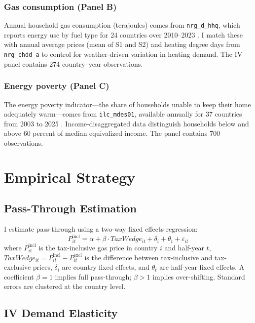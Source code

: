 \documentclass[12pt]{article}
\begin{document}
\subsubsection*{Gas consumption (Panel B)} Annual household gas consumption (terajoules) comes from \texttt{nrg\_d\_hhq}, which reports energy use by fuel type for 24 countries over 2010--2023 \citep{eurostat_nrg_d_hhq}. I match these with annual average prices (mean of S1 and S2) and heating degree days from \texttt{nrg\_chdd\_a} to control for weather-driven variation in heating demand. The IV panel contains 274 country--year observations.

\subsubsection*{Energy poverty (Panel C)} The energy poverty indicator---the share of households unable to keep their home adequately warm---comes from \texttt{ilc\_mdes01}, available annually for 37 countries from 2003 to 2025 \citep{eurostat_ilc_mdes01}. Income-disaggregated data distinguish households below and above 60 percent of median equivalized income. The panel contains 700 observations.




\section{Empirical Strategy}
\label{sec:strategy}

\subsection{Pass-Through Estimation}

I estimate pass-through using a two-way fixed effects regression:
\begin{equation}
P_{it}^{\text{incl}} = \alpha + \beta \cdot TaxWedge_{it} + \delta_i + \theta_t + \varepsilon_{it}
\label{eq:passthrough}
\end{equation}
where $P_{it}^{\text{incl}}$ is the tax-inclusive gas price in country $i$ and half-year $t$, $TaxWedge_{it} = P_{it}^{\text{incl}} - P_{it}^{\text{excl}}$ is the difference between tax-inclusive and tax-exclusive prices, $\delta_i$ are country fixed effects, and $\theta_t$ are half-year fixed effects. A coefficient $\beta = 1$ implies full pass-through; $\beta > 1$ implies over-shifting. Standard errors are clustered at the country level.

\subsection{IV Demand Elasticity}
\end{document}

